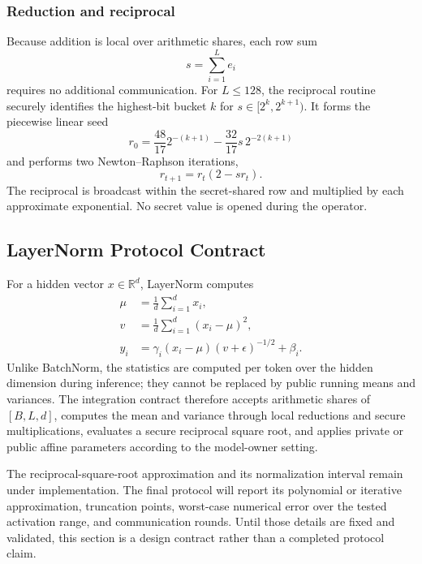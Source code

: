 \subsubsection{Reduction and reciprocal}
Because addition is local over arithmetic shares, each row sum
\begin{equation}
    s=\sum_{i=1}^{L} e_i
    \label{eq:row-sum}
\end{equation}
requires no additional communication. For $L\leq128$, the reciprocal routine securely identifies the highest-bit bucket $k$ for $s\in[2^k,2^{k+1})$. It forms the piecewise linear seed
\begin{equation}
    r_0=\frac{48}{17}2^{-(k+1)}
    -\frac{32}{17}s\,2^{-2(k+1)}
    \label{eq:reciprocal-seed}
\end{equation}
and performs two Newton--Raphson iterations,
\begin{equation}
    r_{t+1}=r_t(2-sr_t).
    \label{eq:newton}
\end{equation}
The reciprocal is broadcast within the secret-shared row and multiplied by each approximate exponential. No secret value is opened during the operator.

\subsection{LayerNorm Protocol Contract}
\label{sec:layernorm}
For a hidden vector $x\in\mathbb{R}^{d}$, LayerNorm computes
\begin{align}
    \mu &= \frac{1}{d}\sum_{i=1}^{d}x_i, \\
    v &= \frac{1}{d}\sum_{i=1}^{d}(x_i-\mu)^2, \\
    y_i &= \gamma_i(x_i-\mu)(v+\epsilon)^{-1/2}+\beta_i.
    \label{eq:layernorm}
\end{align}
Unlike BatchNorm, the statistics are computed per token over the hidden dimension during inference; they cannot be replaced by public running means and variances. The integration contract therefore accepts arithmetic shares of $[B,L,d]$, computes the mean and variance through local reductions and secure multiplications, evaluates a secure reciprocal square root, and applies private or public affine parameters according to the model-owner setting.

The reciprocal-square-root approximation and its normalization interval remain under implementation. The final protocol will report its polynomial or iterative approximation, truncation points, worst-case numerical error over the tested activation range, and communication rounds. Until those details are fixed and validated, this section is a design contract rather than a completed protocol claim.

